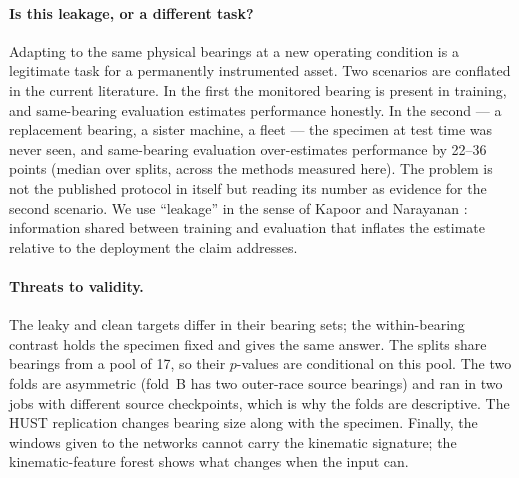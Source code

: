 \paragraph{Is this leakage, or a different task?} Adapting to the same physical bearings at a new operating condition is a
legitimate task for a permanently instrumented asset. Two scenarios are conflated in the current literature. In the first the
monitored bearing is present in training, and same-bearing evaluation estimates performance honestly. In the second ---
a replacement bearing, a sister machine, a fleet --- the specimen at test time was never seen, and same-bearing evaluation
over-estimates performance by 22--36 points (median over splits, across the methods measured here). The problem is not the
published protocol in itself but reading its number as evidence for the second scenario. We use ``leakage'' in the sense of
Kapoor and Narayanan \cite{kapoor2023leakage}: information shared between training and evaluation that inflates the estimate
relative to the deployment the claim addresses.

\paragraph{Threats to validity.} The leaky and clean targets differ in their bearing sets; the within-bearing contrast holds
the specimen fixed and gives the same answer. The splits share bearings from a pool of 17, so their $p$-values are conditional
on this pool. The two folds are asymmetric (fold~B has two outer-race source bearings) and ran in two jobs with different
source checkpoints, which is why the folds are descriptive. The HUST replication changes bearing size along with the
specimen. Finally, the windows given to the networks cannot carry the kinematic signature; the kinematic-feature forest shows
what changes when the input can.
